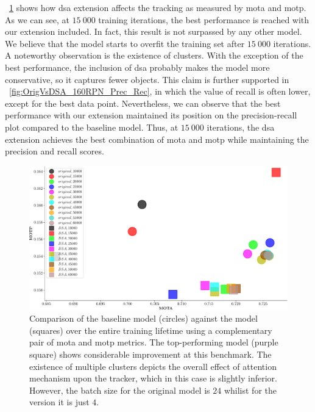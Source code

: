\figtext{}~\ref{fig:OrigVsDSA_160RPN_MOTA_MOTP} shows how \gls{dsa} extension affects the tracking as measured by \gls{mota} and \gls{motp}. As we can see, at $15\ 000$ training iterations, the best performance is reached with our extension included. In fact, this result is not surpassed by any other model. We believe that the model starts to overfit the training set after $15\ 000$ iterations. A noteworthy observation is the existence of clusters. With the exception of the best performance, the inclusion of \gls{dsa} probably makes the model more conservative, so it captures fewer objects. This claim is further supported in \figtext{}~\ref{fig:OrigVsDSA_160RPN_Prec_Rec}, in which the value of recall is often lower, except for the best data point. Nevertheless, we can observe that the best performance with our extension maintained its position on the precision-recall plot compared to the baseline model. Thus, at $15\ 000$ iterations, the \gls{dsa} extension achieves the best combination of \gls{mota} and \gls{motp} while maintaining the precision and recall scores.

\begin{figure}[t]
    \centerline{\includegraphics[width=\linewidth]{figures/siamese_tracking/tracker_cmp_160_2x12_vs_160_2x2_DSA_MOTA_MOTP.pdf}}
    \caption[\gls{dsa} evaluation - primary metrics]{Comparison of the baseline model (circles) against the \dsamodel{} model (squares) over the entire training lifetime using a complementary pair of \gls{mota} and \gls{motp} metrics. The top-performing \dsamodel{} model (purple square) shows considerable improvement at this benchmark. The existence of multiple clusters depicts the overall effect of attention mechanism upon the tracker, which in this case is slightly inferior. However, the batch size for the original model is $24$ whilist for the \dsamodel{} version it is just $4$.}
    \label{fig:OrigVsDSA_160RPN_MOTA_MOTP}
\end{figure}

